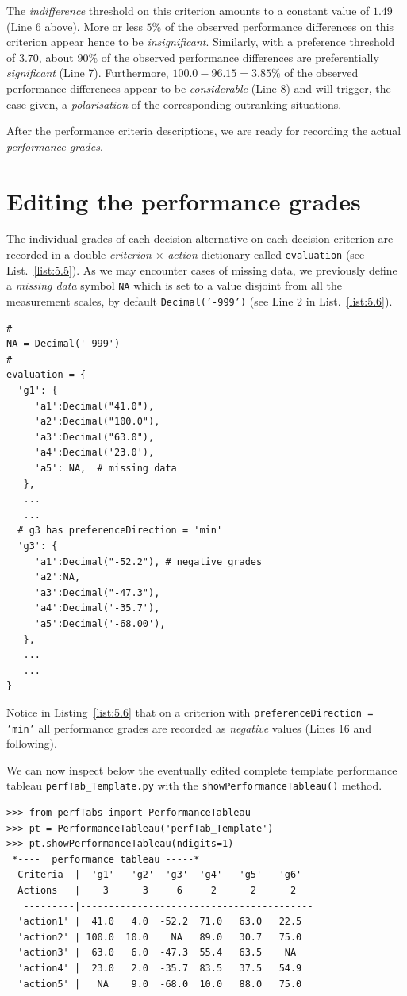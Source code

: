 The \emph{indifference} threshold on this criterion amounts to a constant value of $1.49$ (Line 6 above). More or less $5\%$ of the observed performance differences on this criterion appear hence to be \emph{insignificant}. Similarly, with a preference threshold of $3.70$, about $90\%$ of the observed performance differences are preferentially \emph{significant} (Line 7). Furthermore, $100.0 - 96.15 = 3.85\%$ of the observed performance differences appear to be \emph{considerable} (Line 8) and will trigger, the case given, a \emph{polarisation} of the corresponding outranking situations.

After the performance criteria descriptions, we are ready for recording the actual \emph{performance grades}.

\section{Editing the performance grades}
\label{sec:5.5}

The individual grades of each decision alternative on each decision criterion are recorded in a double \emph{criterion} $\times$ \emph{action} dictionary called \texttt{evaluation} (see List.~\ref{list:5.5}). As we may encounter cases of missing data, we previously define a \emph{missing data} symbol \texttt{NA} which is set to a value disjoint from all the measurement scales, by default \texttt{Decimal('-999')} (see Line 2 in List.~\vref{list:5.6}).
\begin{lstlisting}[caption={Editing performance grades},label=list:5.6]
#----------
NA = Decimal('-999')
#----------
evaluation = {
  'g1': {
     'a1':Decimal("41.0"),
     'a2':Decimal("100.0"),
     'a3':Decimal("63.0"),
     'a4':Decimal('23.0'),
     'a5': NA,  # missing data
   },
   ...
   ...
  # g3 has preferenceDirection = 'min'
  'g3': {
     'a1':Decimal("-52.2"), # negative grades
     'a2':NA,
     'a3':Decimal("-47.3"),
     'a4':Decimal('-35.7'),
     'a5':Decimal('-68.00'),
   },
   ...
   ...
}
\end{lstlisting}

Notice in Listing~\vref{list:5.6} that on a criterion with \texttt{preference\-Direction = 'min'} all performance grades are recorded as \emph{negative} values (Lines 16 and following).

We can now inspect below the eventually edited complete template performance tableau \texttt{perfTab\_Template.py} with the \texttt{showPerformanceTableau()} method.
\begin{lstlisting}
>>> from perfTabs import PerformanceTableau   
>>> pt = PerformanceTableau('perfTab_Template')
>>> pt.showPerformanceTableau(ndigits=1)
 *----  performance tableau -----*
  Criteria  |  'g1'   'g2'  'g3'  'g4'   'g5'   'g6'   
  Actions   |    3      3     6     2      2      2    
   ---------|-----------------------------------------
  'action1' |  41.0   4.0  -52.2  71.0   63.0   22.5  
  'action2' | 100.0  10.0    NA   89.0   30.7   75.0  
  'action3' |  63.0   6.0  -47.3  55.4   63.5    NA   
  'action4' |  23.0   2.0  -35.7  83.5   37.5   54.9  
  'action5' |   NA    9.0  -68.0  10.0   88.0   75.0
\end{lstlisting}

